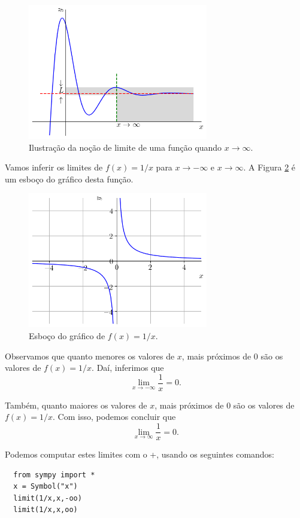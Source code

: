 \begin{figure}[H]
  \centering
  \includegraphics[width=0.7\textwidth]{./cap_lim/dados/fig_lim_x2infty/fig_lim_x2infty}
  \caption{Ilustração da noção de limite de uma função quando $x\to \infty$.}
  \label{fig:lim_x2infty}
\end{figure}


\begin{ex}
  Vamos inferir os limites de $f(x) = 1/x$ para $x\to -\infty$ e $x\to \infty$. A Figura \ref{fig:lim_xinf_1x} é um esboço do gráfico desta função.

\begin{figure}[H]
  \centering
  \includegraphics[width=0.7\textwidth]{./cap_lim/dados/fig_lim_xinf_1x/fig_lim_xinf_1x}
  \caption{Esboço do gráfico de $f(x) = 1/x$.}
  \label{fig:lim_xinf_1x}
\end{figure}

Observamos que quanto menores os valores de $x$, mais próximos de $0$ são os valores de $f(x)=1/x$. Daí, inferimos que
\begin{equation}
  \lim_{x\to -\infty} \frac{1}{x} = 0.
\end{equation}

Também, quanto maiores os valores de $x$, mais próximos de $0$ são os valores de $f(x)=1/x$. Com isso, podemos concluir que
\begin{equation}
  \lim_{x\to \infty} \frac{1}{x} = 0.
\end{equation}

\ifispython
Podemos computar estes limites com o {\python}+{\sympy}, usando os seguintes comandos:
\begin{lstlisting}
  from sympy import *
  x = Symbol("x")
  limit(1/x,x,-oo)
  limit(1/x,x,oo)
\end{lstlisting}
\fi
\end{ex}

